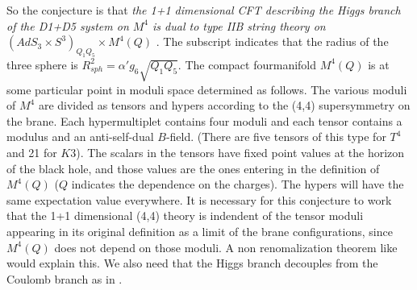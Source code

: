 So the conjecture is that {\it  the 1+1 dimensional CFT describing
the Higgs branch of the D1+D5 system on $M^4$  
is dual to 
type IIB string theory on $(AdS_3\times S^3)_{Q_1Q_5}\times M^4(Q)$ }.
The subscript indicates that the radius of the three
sphere is $R^2_{sph} = \alpha' { g_6 \sqrt{Q_1 Q_5} }$. 
 The compact fourmanifold $M^4(Q)$ is at some
particular point in moduli space determined as follows.
The various moduli of $M^4$ are divided as tensors  and hypers according to
the (4,4) supersymmetry on the brane.
Each hypermultiplet contains four moduli and each tensor contains a 
modulus and an anti-self-dual $B$-field. (There
are five tensors of this type for $T^4$ and 21 for $K3$). 
 The scalars in the tensors  have fixed point 
values at the horizon of the black hole, and those values are the
ones entering in the definition of $M^4(Q)$ ($Q$ indicates the dependence
on the charges). The hypers will have the
same expectation value everywhere. 
It is necessary for this conjecture to work that the 1+1 dimensional 
(4,4) theory is indendent of the tensor moduli appearing in its original 
definition as a limit of the brane configurations, since $M^4(Q)$ does not
depend on those moduli. 
A non renomalization theorem like  would explain this. 
We also need that the Higgs branch decouples from the Coulomb branch as
in . 


